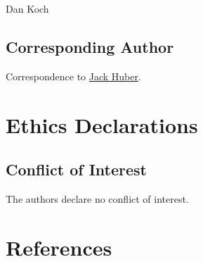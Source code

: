 \documentclass[
]{article}
\newlength{\cslhangindent}
\newlength{\cslentryspacingunit} %
\newenvironment{CSLReferences}[2] %
 {%
  \setlength{\parindent}{0pt}
  \ifodd #1
  \let\oldpar\par
  \def\par{\hangindent=\cslhangindent\oldpar}
  \fi
  \setlength{\parskip}{#2\cslentryspacingunit}
 }%
 {}
\begin{document}
Dan Koch

\hypertarget{corresponding-author}{%
\subsection{Corresponding Author}\label{corresponding-author}}

Correspondence to \href{mailto:jack.bernard.huber@gmail.com}{Jack Huber}.

\hypertarget{ethics-declarations}{%
\section{Ethics Declarations}\label{ethics-declarations}}

\hypertarget{conflict-of-interest}{%
\subsection{Conflict of Interest}\label{conflict-of-interest}}

The authors declare no conflict of interest.

\hypertarget{references}{%
\section*{References}\label{references}}

\hypertarget{refs}{}
\begin{CSLReferences}{0}{0}
\end{CSLReferences}

  
\end{document}
